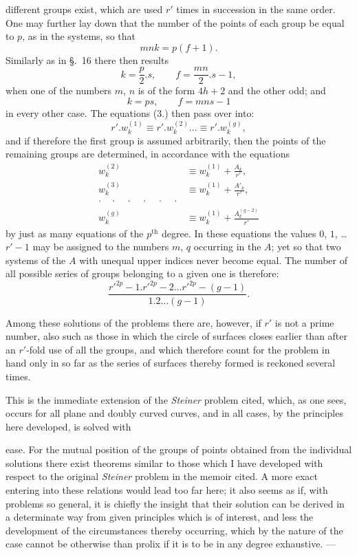\documentclass{article}
\begin{document}
different groups exist, which are used $r'$ times in succession in the same order. One may further lay down that the number of the points of each group be equal to $p$, as in the systems, so that
\[ mnk = p(f+1). \]
Similarly as in §.~16 there then results
\[ k=\frac{p}{2}.s, \qquad f=\frac{mn}{2}.s-1, \]
when one of the numbers $m$, $n$ is of the form $4h+2$ and the other odd; and
\[ k=ps, \qquad f=mns-1 \]
in every other case. The equations (3.) then pass over into:
\[ r'.w_{k}^{(1)} \equiv r'.w_{k}^{(2)} \ldots \equiv r'.w_{k}^{(g)}, \]
and if therefore the first group is assumed arbitrarily, then the points of the remaining groups are determined, in accordance with the equations
\[ \begin{aligned}
w_{k}^{(2)} &\equiv w_{k}^{(1)}+\frac{A_{k}}{r'}, \\
w_{k}^{(3)} &\equiv w_{k}^{(1)}+\frac{A'_{k}}{r'}, \\
\cdot\quad\cdot\quad\cdot\quad\cdot\quad\cdot\quad\cdot & \\
w_{k}^{(g)} &\equiv w_{k}^{(1)}+\frac{A_{k}^{(g-2)}}{r'}
\end{aligned} \]
by just as many equations of the $p^{\text{th}}$ degree. In these equations the values $0$, $1$, \ldots $r'-1$ may be assigned to the numbers $m$, $q$ occurring in the $A$; yet so that two systems of the $A$ with unequal upper indices never become equal. The number of all possible series of groups belonging to a given one is therefore:
\[ \frac{{r'}^{2p}-1.{r'}^{2p}-2\ldots{r'}^{2p}-(g-1)}{1.2\ldots(g-1)}. \]

Among these solutions of the problems there are, however, if $r'$ is not a prime number, also such as those in which the circle of surfaces closes earlier than after an $r'$-fold use of all the groups, and which therefore count for the problem in hand only in so far as the series of surfaces thereby formed is reckoned several times.

This is the immediate extension of the \emph{Steiner} problem cited, which, as one sees, occurs for all plane and doubly curved curves, and in all cases, by the principles here developed, is solved with

ease. For the mutual position of the groups of points obtained from the individual solutions there exist theorems similar to those which I have developed with respect to the original \emph{Steiner} problem in the memoir cited. A more exact entering into these relations would lead too far here; it also seems as if, with problems so general, it is chiefly the insight that their solution can be derived in a determinate way from given principles which is of interest, and less the development of the circumstances thereby occurring, which by the nature of the case cannot be otherwise than prolix if it is to be in any degree exhaustive. ---
\end{document}
